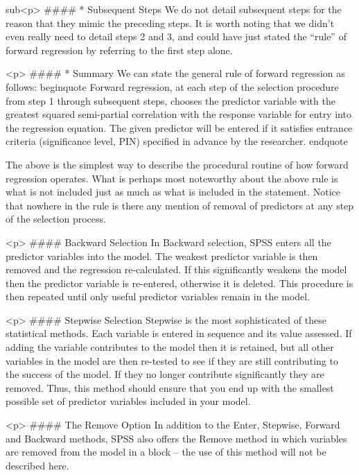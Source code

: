 sub<p>
####        * {Subsequent Steps} 
We do not detail subsequent steps for the reason that they mimic the preceding steps. It is worth noting that we didn’t even really need to detail steps 2 and 3, and could have just stated the “rule” of forward regression by referring to the first step alone. 

<p>
####        * {Summary}
We can state the general rule of forward regression as follows:
begin{quote}
	Forward regression, at each step of the selection procedure from step 1 through subsequent steps, chooses the predictor variable with the greatest squared semi-partial correlation with the response variable for entry into the regression equation. The given predictor will be entered if it satisfies entrance criteria (significance level, PIN) specified in advance by the researcher.
end{quote}

The above is the simplest way to describe the procedural routine of how forward regression operates. What is perhaps most noteworthy about the above rule is what is not included just as much as what is included in the statement. Notice that nowhere in the rule is there any mention of removal of predictors at any step of the selection process. 


<p>
#### {Backward Selection}
In Backward selection, SPSS enters all the predictor variables into the model. The weakest predictor variable is then removed and the regression re-calculated. If this significantly weakens the model then the predictor variable is re-entered, otherwise it is deleted. This procedure is then repeated until only useful predictor variables remain in the model.


<p>
#### {Stepwise Selection}
Stepwise is the most sophisticated of these statistical methods. Each variable is entered in sequence and its value assessed. If adding the variable contributes to the model then it is retained, but all other variables in the model are then re-tested to see if they are still contributing to the success of the model. If they no longer contribute significantly they are removed. Thus, this method should ensure that you end up with the smallest possible set of predictor variables included in your model.

<p>
#### {The Remove Option}
In addition to the Enter, Stepwise, Forward and Backward methods, SPSS also offers the Remove method in which variables are removed from the model in a block – the use of this method will not be described here.


